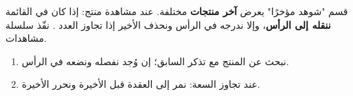 \begin{statement}
قسم "شوهد مؤخرًا" يعرض \textbf{آخر  منتجات} مختلفة. عند مشاهدة منتج: إذا كان في القائمة \textbf{ننقله إلى الرأس}، وإلا ندرجه في الرأس ونحذف الأخير إذا تجاوز العدد . نفّذ سلسلة مشاهدات.
\end{statement}
\begin{stepsbox}\begin{enumerate}
\item نبحث عن المنتج مع تذكر السابق؛ إن وُجد نفصله ونضعه في الرأس.
\item عند تجاوز السعة: نمر إلى العقدة قبل الأخيرة ونحرر الأخيرة.
\end{enumerate}\end{stepsbox}
